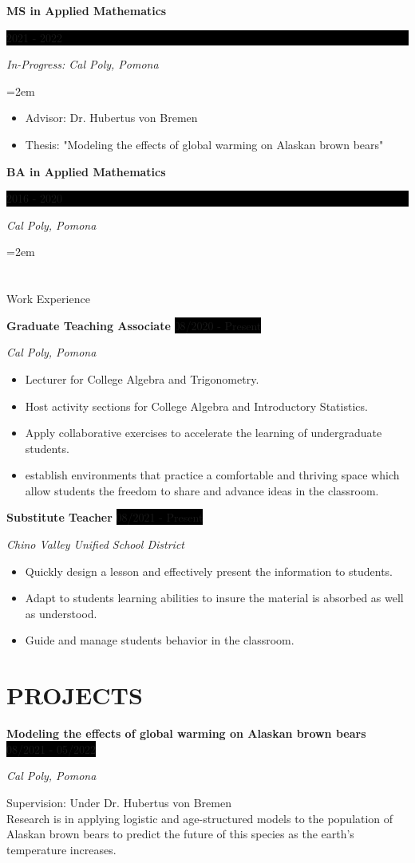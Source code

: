 \documentclass[paper=a4,fontsize=10pt]{scrartcl} %
\newcommand{\sepspace}{\vspace*{1em}}		%
\newcommand{\NewPart}[1]{\section*{\uppercase{#1}}}
\newcommand{\EducationEntry}[4]{
		\noindent \textbf{#1} \hfill      %
		\colorbox{Black}{%
			\parbox{5em}{%
			\hfill\color{White}#2}} \par  %
		\noindent \textit{#3} \par        %
		\noindent\hangindent=2em\hangafter=0 \small #4 %
		\normalsize \par}
\newcommand{\WorkEntry}[4]{				  %
		\noindent \textbf{#1} \hfill      %
		\colorbox{Black}{\color{White}#2} \par  %
		\noindent \textit{#3} \par              %
		\noindent \small #4 %
		\normalsize}
\begin{document}

\EducationEntry{MS in Applied Mathematics}{2021 - 2022}{In-Progress: Cal Poly, Pomona}
{
\begin{itemize}
    \item Advisor: Dr. Hubertus von Bremen
    \item Thesis: "Modeling the effects of global warming on Alaskan brown bears"
\end{itemize}
}
\sepspace

\EducationEntry{BA in Applied Mathematics}{2016 - 2020}{Cal Poly, Pomona}



\NewPart{Work Experience}{}

\WorkEntry{Graduate Teaching Associate}
{08/2020 - Present}
{Cal Poly, Pomona}
{\begin{itemize}[leftmargin=*]
    \item Lecturer for College Algebra and Trigonometry.
    \item Host activity sections for College Algebra and Introductory Statistics.
    \item Apply collaborative exercises to accelerate the learning of undergraduate students.
    \item establish environments that practice a comfortable and thriving space which allow students the freedom to share and advance ideas in the classroom.
\end{itemize}}

\sepspace

\WorkEntry{Substitute Teacher}
{08/2021 - Present}
{Chino Valley Unified School District}
{\begin{itemize}[leftmargin=*]
    \item Quickly design a lesson and effectively present the information to students.
    \item Adapt to students learning abilities to insure the material is absorbed as well as understood.
    \item Guide and manage students behavior in the classroom.
\end{itemize}}


\NewPart{Projects}{}

\WorkEntry{Modeling the effects of global warming on Alaskan brown bears}
{08/2021 - 05/2022}
{Cal Poly, Pomona}
{Supervision: Under Dr. Hubertus von Bremen\\
 Research is in applying logistic and age-structured models to the population of Alaskan brown bears to predict the future of this species as the earth's temperature increases.
}
\end{document}
